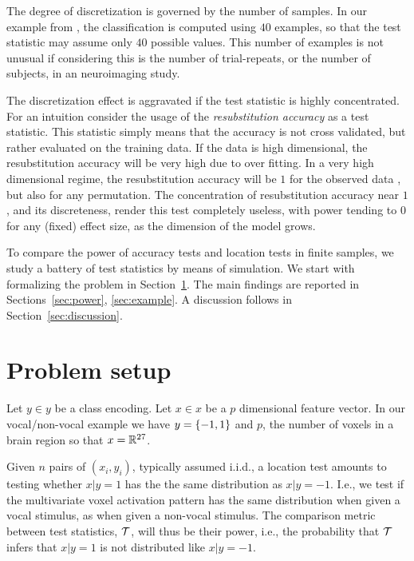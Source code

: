 \documentclass[12pt,a4paper]{article}
\begin{document}
The degree of discretization is governed by the number of samples. 
In our example from \citet{gilron_quantifying_2016}, the classification is computed using $40$ examples, so that the test statistic may assume only $40$ possible values. 
This number of examples is not unusual if considering this is the number of trial-repeats, or the number of subjects, in an neuroimaging study. 

The discretization effect is aggravated if the test statistic is highly concentrated. 
For an intuition consider the usage of the \emph{resubstitution accuracy} as a test statistic. 
This statistic simply means that the accuracy is not cross validated, but rather evaluated on the training data.
If the data is high dimensional, the resubstitution accuracy will be very high due to over fitting. 
In a very high dimensional regime, the resubstitution accuracy will be $1$ for the observed data \cite[Theorem 1]{mclachlan_bias_1976}, but also for any permutation.
The concentration of resubstitution accuracy near $1$, and its discreteness, render this test completely useless, with power tending to $0$ for any (fixed) effect size, as the dimension of the model grows. 


To compare the power of accuracy tests and location tests in finite samples, we study a battery of test statistics by means of simulation. 
We start with formalizing the problem in Section~\ref{sec:problem_setup}.
The main findings are reported in Sections~\ref{sec:power}, \ref{sec:example}.
A discussion follows in Section~\ref{sec:discussion}. 



\section{Problem setup}
\label{sec:problem_setup}

Let $y \in y$ be a class encoding. 
Let $x \in x$ be a $p$ dimensional feature vector. 
In our vocal/non-vocal example we have $y=\{ -1,1 \}$ and $p$, the number of voxels in a brain region so that $x=\mathbb{R}^{27}$. 

Given $n$ pairs of $(x_i,y_i)$, typically assumed i.i.d., a location test amounts to testing whether $x|y=1$ has the the same distribution as $x|y=-1$. 
I.e., we test if the multivariate voxel activation pattern has the same distribution when given a vocal stimulus, as when given a non-vocal stimulus. 
The comparison metric between test statistics, $\mathcal{T}$, will thus be their power, i.e., the probability that $\mathcal{T}$ infers that $x|y=1$ is not distributed like $x|y=-1$.
\end{document}
